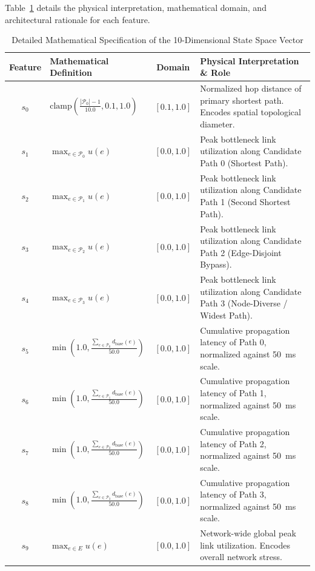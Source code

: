 Table~\ref{tab:state_features_breakdown} details the physical interpretation, mathematical domain, and architectural rationale for each feature.

\begin{table}[htbp]
\centering
\caption{Detailed Mathematical Specification of the 10-Dimensional State Space Vector}
\label{tab:state_features_breakdown}
\small
\begin{tabularx}{\textwidth}{c l c X}
\toprule
\textbf{Feature} & \textbf{Mathematical Definition} & \textbf{Domain} & \textbf{Physical Interpretation \& Role} \\
\midrule
$s_0$ & $\text{clamp}\left(\frac{|\mathcal{P}_0| - 1}{10.0}, 0.1, 1.0\right)$ & $[0.1, 1.0]$ & Normalized hop distance of primary shortest path. Encodes spatial topological diameter. \\
\addlinespace
$s_1$ & $\max_{e \in \mathcal{P}_0} u(e)$ & $[0.0, 1.0]$ & Peak bottleneck link utilization along Candidate Path 0 (Shortest Path). \\
\addlinespace
$s_2$ & $\max_{e \in \mathcal{P}_1} u(e)$ & $[0.0, 1.0]$ & Peak bottleneck link utilization along Candidate Path 1 (Second Shortest Path). \\
\addlinespace
$s_3$ & $\max_{e \in \mathcal{P}_2} u(e)$ & $[0.0, 1.0]$ & Peak bottleneck link utilization along Candidate Path 2 (Edge-Disjoint Bypass). \\
\addlinespace
$s_4$ & $\max_{e \in \mathcal{P}_3} u(e)$ & $[0.0, 1.0]$ & Peak bottleneck link utilization along Candidate Path 3 (Node-Diverse / Widest Path). \\
\addlinespace
$s_5$ & $\min\left(1.0, \frac{\sum_{e \in \mathcal{P}_0} d_{\text{base}}(e)}{50.0}\right)$ & $[0.0, 1.0]$ & Cumulative propagation latency of Path 0, normalized against 50~ms scale. \\
\addlinespace
$s_6$ & $\min\left(1.0, \frac{\sum_{e \in \mathcal{P}_1} d_{\text{base}}(e)}{50.0}\right)$ & $[0.0, 1.0]$ & Cumulative propagation latency of Path 1, normalized against 50~ms scale. \\
\addlinespace
$s_7$ & $\min\left(1.0, \frac{\sum_{e \in \mathcal{P}_2} d_{\text{base}}(e)}{50.0}\right)$ & $[0.0, 1.0]$ & Cumulative propagation latency of Path 2, normalized against 50~ms scale. \\
\addlinespace
$s_8$ & $\min\left(1.0, \frac{\sum_{e \in \mathcal{P}_3} d_{\text{base}}(e)}{50.0}\right)$ & $[0.0, 1.0]$ & Cumulative propagation latency of Path 3, normalized against 50~ms scale. \\
\addlinespace
$s_9$ & $\max_{e \in E} u(e)$ & $[0.0, 1.0]$ & Network-wide global peak link utilization. Encodes overall network stress. \\
\bottomrule
\end{tabularx}
\end{table}

